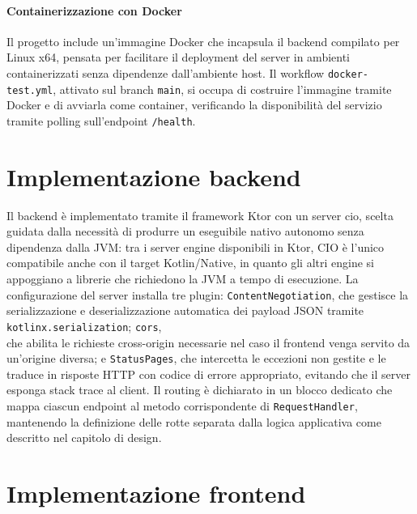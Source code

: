 \paragraph{Containerizzazione con Docker}

Il progetto include un'immagine Docker che incapsula il backend compilato per Linux x64, pensata per facilitare il deployment del server in ambienti containerizzati senza dipendenze dall'ambiente host. Il workflow \texttt{docker-test.yml}, attivato sul branch \texttt{main}, si occupa di costruire l'immagine tramite Docker e di avviarla come container, verificando la disponibilità del servizio tramite polling sull'endpoint \texttt{/health}.

\section{Implementazione backend}
\label{sec:impl-backend}

Il backend è implementato tramite il framework Ktor con un server \ac{cio}, scelta guidata dalla necessità di produrre un eseguibile nativo autonomo senza dipendenza dalla JVM: tra i server engine disponibili in Ktor, CIO è l'unico compatibile anche con il target Kotlin/Native, in quanto gli altri engine si appoggiano a librerie che richiedono la JVM a tempo di esecuzione. La configurazione del server installa tre plugin: \texttt{ContentNegotiation}, che gestisce la serializzazione e deserializzazione automatica dei payload JSON tramite \texttt{kotlinx.serialization}; \texttt{\ac{cors}}, \\che abilita le richieste cross-origin necessarie nel caso il frontend venga servito da un'origine diversa; e \texttt{StatusPages}, che intercetta le eccezioni non gestite e le traduce in risposte HTTP con codice di errore appropriato, evitando che il server esponga stack trace al client. Il routing è dichiarato in un blocco dedicato che mappa ciascun endpoint al metodo corrispondente di \texttt{RequestHandler}, mantenendo la definizione delle rotte separata dalla logica applicativa come descritto nel capitolo di design.

\section{Implementazione frontend}
\label{sec:impl-frontend}

